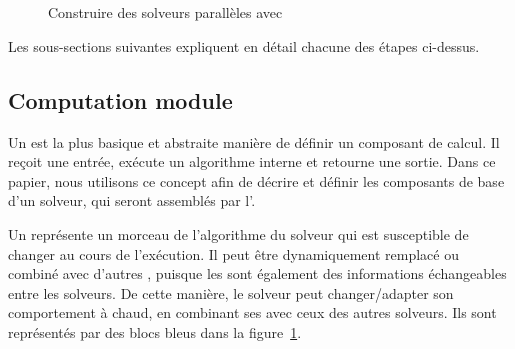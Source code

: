 \begin{figure}
	\centering
	\\
	\\
	\caption[]{Construire des solveurs parallèles avec \posl{}}
	\label{fig:posl}
\end{figure}%

Les sous-sections suivantes expliquent en détail chacune des étapes ci-dessus.

\subsection{Computation module}

Un \om{}  est la plus basique  et abstraite manière de  définir un composant de calcul. Il reçoit une entrée, exécute un algorithme interne et retourne une sortie. Dans ce papier, nous utilisons ce concept afin de décrire et  définir les composants de base d'un  solveur, qui seront assemblés par l'\as.  

Un \om{} représente un  morceau de l'algorithme  du solveur  qui est susceptible de changer au cours de  l'exécution.   Il  peut  être
dynamiquement remplacé  ou combiné avec d'autres  \oms, puisque les \oms{}  sont  également  des   informations  échangeables  entre  les
solveurs. De  cette manière,  le  solveur  peut changer/adapter  son comportement à  chaud, en combinant  ses \oms{} avec ceux  des autres solveurs. Ils sont  représentés par  des blocs  bleus dans  la figure~\ref{fig:posl}.

